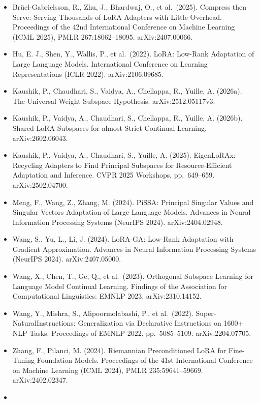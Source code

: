 \documentclass[
  11pt,
]{article}
\providecommand{\tightlist}{%
  \setlength{\itemsep}{0pt}\setlength{\parskip}{0pt}}
\begin{document}
\begin{itemize}
\tightlist
\item
  Br\"{u}el-Gabrielsson, R., Zhu, J., Bhardwaj, O., et al.~(2025). Compress
  then Serve: Serving Thousands of LoRA Adapters with Little Overhead.
  Proceedings of the 42nd International Conference on Machine Learning
  (ICML 2025), PMLR 267:18062--18095. arXiv:2407.00066.
\item
  Hu, E. J., Shen, Y., Wallis, P., et al.~(2022). LoRA: Low-Rank
  Adaptation of Large Language Models. International Conference on
  Learning Representations (ICLR 2022). arXiv:2106.09685.
\item
  Kaushik, P., Chaudhari, S., Vaidya, A., Chellappa, R., Yuille, A.
  (2026a). The Universal Weight Subspace Hypothesis. arXiv:2512.05117v3.
\item
  Kaushik, P., Vaidya, A., Chaudhari, S., Chellappa, R., Yuille, A.
  (2026b). Shared LoRA Subspaces for almost Strict Continual Learning.
  arXiv:2602.06043.
\item
  Kaushik, P., Vaidya, A., Chaudhari, S., Yuille, A. (2025). EigenLoRAx:
  Recycling Adapters to Find Principal Subspaces for Resource-Efficient
  Adaptation and Inference. CVPR 2025 Workshops, pp.~649--659.
  arXiv:2502.04700.
\item
  Meng, F., Wang, Z., Zhang, M. (2024). PiSSA: Principal Singular Values
  and Singular Vectors Adaptation of Large Language Models. Advances in
  Neural Information Processing Systems (NeurIPS 2024).
  arXiv:2404.02948.
\item
  Wang, S., Yu, L., Li, J. (2024). LoRA-GA: Low-Rank Adaptation with
  Gradient Approximation. Advances in Neural Information Processing
  Systems (NeurIPS 2024). arXiv:2407.05000.
\item
  Wang, X., Chen, T., Ge, Q., et al.~(2023). Orthogonal Subspace
  Learning for Language Model Continual Learning. Findings of the
  Association for Computational Linguistics: EMNLP 2023.
  arXiv:2310.14152.
\item
  Wang, Y., Mishra, S., Alipoormolabashi, P., et al.~(2022).
  Super-NaturalInstructions: Generalization via Declarative Instructions
  on 1600+ NLP Tasks. Proceedings of EMNLP 2022, pp.~5085--5109.
  arXiv:2204.07705.
\item
  Zhang, F., Pilanci, M. (2024). Riemannian Preconditioned LoRA for
  Fine-Tuning Foundation Models. Proceedings of the 41st International
  Conference on Machine Learning (ICML 2024), PMLR 235:59641--59669.
  arXiv:2402.02347.
\item

\end{itemize}
\end{document}
